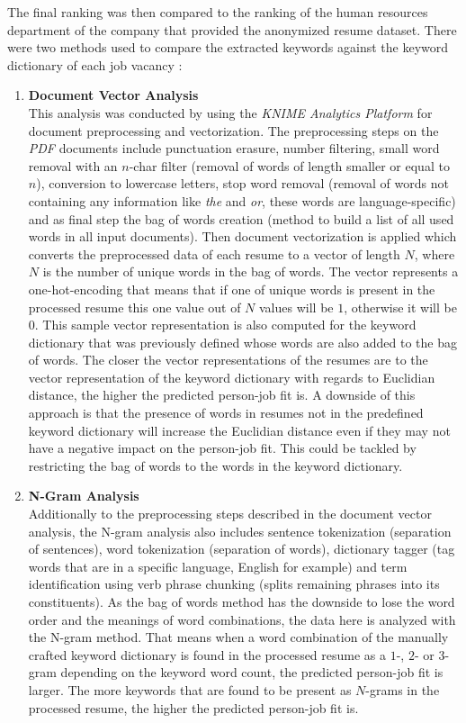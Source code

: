 \documentclass[draft,final]{thesisclass} %
\begin{document}
The final ranking was then compared to the ranking of the human resources department of the company that provided the anonymized resume dataset.
There were two methods used to compare the extracted keywords against the keyword dictionary of each job vacancy \parencite[53-58]{text_mining_for_automatic_profiling}:
\begin{enumerate}
    \item \textbf{Document Vector Analysis}\\
    This analysis was conducted by using the \textit{KNIME Analytics Platform} for document preprocessing and vectorization.
    The preprocessing steps on the \textit{PDF} documents include punctuation erasure, number filtering, small word removal with an $n$-char filter (removal of words of length smaller or equal to $n$), conversion to lowercase letters, stop word removal (removal of words not containing any information like \textit{the} and \textit{or}, these words are language-specific) and as final step the bag of words creation (method to build a list of all used words in all input documents).
    Then document vectorization is applied which converts the preprocessed data of each resume to a vector of length $N$, where $N$ is the number of unique words in the bag of words.
    The vector represents a one-hot-encoding that means that if one of unique words is present in the processed resume this one value out of $N$ values will be $1$, otherwise it will be $0$.
    This sample vector representation is also computed for the keyword dictionary that was previously defined whose words are also added to the bag of words.
    The closer the vector representations of the resumes are to the vector representation of the keyword dictionary with regards to Euclidian distance, the higher the predicted person-job fit is.
    A downside of this approach is that the presence of words in resumes not in the predefined keyword dictionary will increase the Euclidian distance even if they may not have a negative impact on the person-job fit. 
    This could be tackled by restricting the bag of words to the words in the keyword dictionary.
    \item \textbf{N-Gram Analysis}\\
    Additionally to the preprocessing steps described in the document vector analysis, the N-gram analysis also includes sentence tokenization (separation of sentences), word tokenization (separation of words), dictionary tagger (tag words that are in a specific language, English for example) and term identification using verb phrase chunking (splits remaining phrases into its constituents).
    As the bag of words method has the downside to lose the word order and the meanings of word combinations, the data here is analyzed with the N-gram method.
    That means when a word combination of the manually crafted keyword dictionary is found in the processed resume as a $1$-, $2$- or $3$-gram depending on the keyword word count, the predicted person-job fit is larger.
    The more keywords that are found to be present as $N$-grams in the processed resume, the higher the predicted person-job fit is.
\end{enumerate}
\end{document}

